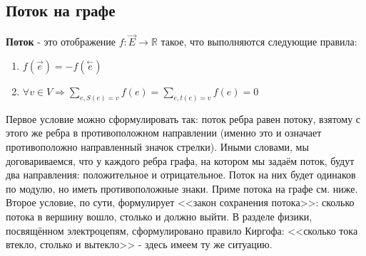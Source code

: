 \subsection{Поток на графе}
\begin{definition}
    \textbf{Поток} - это отображение $f:\overrightarrow{E} \rightarrow \mathbb{R}$
    такое, что выполняются следующие правила:

    \begin{enumerate}
        \item $f(\overrightarrow{e}) = -f(\stackrel{\leftarrow}{e})$
        \item $\forall v\in V\Rightarrow \sum\limits_{e, S(e)=v}f(e) = \sum\limits_{e, t(e)=v}f(e) =0$
    \end{enumerate}
\end{definition}
\begin{explanation*}
    Первое условие можно сформулировать так: поток ребра равен потоку, 
    взятому с этого же ребра в противоположном направлении (именно это и означает 
    противоположно направленный значок стрелки). Иными словами, мы договариваемся, что у каждого 
    ребра графа, на котором мы задаём поток, будут два направления: положительное и отрицательное. 
    Поток на них будет одинаков по модулю, но иметь противоположные знаки. Приме потока на графе 
    см. ниже.\\
    Второе условие, по сути, формулирует <<закон сохранения потока>>:
    сколько потока в вершину вошло, столько и должно выйти. В разделе физики, посвящённом электроцепям, 
    сформулировано правило Киргофа: <<сколько тока втекло, столько и вытекло>> - здесь имеем ту же ситуацию.
\end{explanation*}

